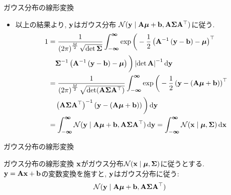 \documentclass[dvipdfmx,notheorems,t]{beamer}
\begin{document}
\begin{frame}{ガウス分布の線形変換}
\begin{itemize}
  \item 以上の結果より, $\vb{y}$はガウス分布
  $\mathcal{N}(\vb{y} \mid \vb{A} \vb*{\mu} + \vb{b}, \vb{A} \vb{\Sigma} \vb{A}^\top)$に従う.
  \begin{align*}
    1 &= \frac{1}{\left( 2\pi \right)^\frac{M}{2} \sqrt{\det \vb{\Sigma}}}
      \int_{-\boldsymbol{\infty}}^{\boldsymbol{\infty}}
      \exp \bigg( -\frac{1}{2} \left( \vb{A}^{-1} \left( \vb{y} - \vb{b} \right) - \vb*{\mu} \right)^\top \\
    & \quad \vb{\Sigma}^{-1} \left( \vb{A}^{-1} \left( \vb{y} - \vb{b} \right) - \vb*{\mu} \right) \bigg)
      \left| \det \vb{A} \right|^{-1} \dd{\vb{y}} \\
    &= \frac{1}{\left( 2\pi \right)^\frac{M}{2} \sqrt{\det(\vb{A} \vb{\Sigma} \vb{A}^\top)}}
      \int_{-\boldsymbol{\infty}}^{\boldsymbol{\infty}}
      \exp \bigg( -\frac{1}{2} \left( \vb{y} - \left( \vb{A} \vb*{\mu} + \vb{b} \right) \right)^\top \\
    & \quad \left( \vb{A} \vb{\Sigma} \vb{A}^\top \right)^{-1}
      \left( \vb{y} - \left( \vb{A} \vb*{\mu} + \vb{b} \right) \right) \bigg) \dd{\vb{y}} \\
    &= \int_{-\boldsymbol{\infty}}^{\boldsymbol{\infty}}
      \mathcal{N}(\vb{y} \mid \vb{A} \vb*{\mu} + \vb{b}, \vb{A} \vb{\Sigma} \vb{A}^\top) \dd{\vb{y}}
    = \int_{-\boldsymbol{\infty}}^{\boldsymbol{\infty}}
      \mathcal{N}(\vb{x} \mid \vb*{\mu}, \vb{\Sigma}) \dd{\vb{x}}
  \end{align*}
\end{itemize}
\end{frame}

\begin{frame}{ガウス分布の線形変換}
\begin{block}{ガウス分布の線形変換}
  $\vb{x}$がガウス分布$\mathcal{N}(\vb{x} \mid \vb*{\mu}, \vb{\Sigma})$に従うとする. \\
  $\vb{y} = \vb{A} \vb{x} + \vb{b}$の変数変換を施すと, $\vb{y}$はガウス分布に従う:
  \begin{align*}
    \mathcal{N}(\vb{y} \mid \vb{A} \vb*{\mu} + \vb{b}, \vb{A} \vb{\Sigma} \vb{A}^\top)
  \end{align*}
\end{block}
\end{frame}
\end{document}
